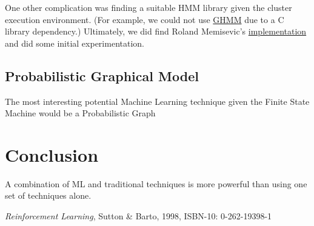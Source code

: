 \documentclass[11pt, oneside]{article}   	%
\begin{document}
One other complication was finding a suitable HMM library given the cluster execution environment. (For example, we could not use \href{www.ghmm.org}{GHMM} due to a C library dependency.) Ultimately, we did find Roland Memisevic's \href{http://www.iro.umontreal.ca/~memisevr/code/hmm.py}{implementation} and did some initial experimentation.

\subsection{Probabilistic Graphical Model}

The most interesting potential Machine Learning technique given the Finite State Machine would be a Probabilistic Graph

\section{Conclusion}
A combination of ML and traditional techniques is more powerful than using one set of techniques alone.

\begin{thebibliography}{1}

 \emph{Reinforcement Learning}, Sutton \& Barto, 1998, ISBN-10: 0-262-19398-1
 
  \end{thebibliography}
\end{document}
